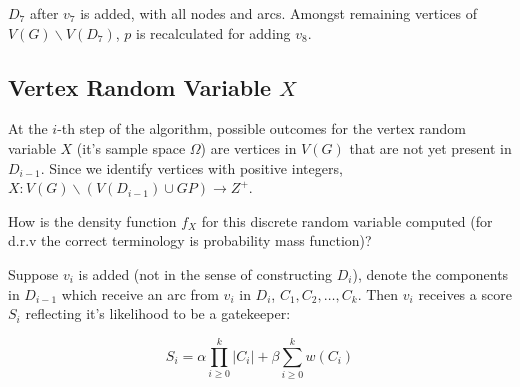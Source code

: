 \documentclass[a4paper]{article}
\begin{document}

$D_7$ after $v_7$ is added, with all nodes and arcs. Amongst remaining vertices of $V(G)\backslash V(D_7)$, $p$ is recalculated for adding $v_8$.  


\subsection*{Vertex Random Variable $X$}

At the $i$-th step of the algorithm, possible outcomes for the vertex random variable $X$ (it's sample space $\Omega$) are vertices in $V(G)$ that are not yet present in $D_{i-1}$. Since we identify vertices with positive integers, $X: V(G)\backslash (V(D_{i-1}) \cup GP) \rightarrow Z^+ $.    

How is the density function $f_X$ for this discrete random variable computed (for d.r.v the correct terminology is probability mass function)? 

Suppose $v_i$ is added (not in the sense of constructing $D_{i}$), denote the components in $D_{i-1}$ which receive an arc from $v_i$ in $D_{i}$, $C_1, C_2,\ldots,C_k$. Then $v_i$ receives a score $S_i$ reflecting it's likelihood to be a gatekeeper:  

\[S_i = \alpha \prod_{i \geq 0}^{k}|C_i| + \beta \sum_{i \geq 0}^{k} w(C_i) \]
\end{document}
